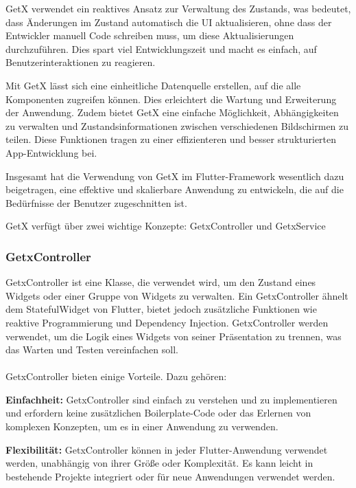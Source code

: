 GetX verwendet ein reaktives Ansatz zur Verwaltung des Zustands, was bedeutet, dass Änderungen im Zustand automatisch die UI aktualisieren, ohne dass der Entwickler manuell Code schreiben muss, um diese Aktualisierungen durchzuführen. Dies spart viel Entwicklungszeit und macht es einfach, auf Benutzerinteraktionen zu reagieren.

Mit GetX lässt sich eine einheitliche Datenquelle erstellen, auf die alle Komponenten zugreifen können. Dies erleichtert die Wartung und Erweiterung der Anwendung. Zudem bietet GetX eine einfache Möglichkeit, Abhängigkeiten zu verwalten und Zustandsinformationen zwischen verschiedenen Bildschirmen zu teilen. Diese Funktionen tragen zu einer effizienteren und besser strukturierten App-Entwicklung bei.

Insgesamt hat die Verwendung von GetX im Flutter-Framework wesentlich dazu beigetragen, eine effektive und skalierbare Anwendung zu entwickeln, die auf die Bedürfnisse der Benutzer zugeschnitten ist.



GetX verfügt über zwei wichtige Konzepte: GetxController und GetxService

\subsubsection{GetxController}
GetxController ist eine Klasse, die verwendet wird, um den Zustand eines Widgets oder einer Gruppe von Widgets zu verwalten. Ein GetxController ähnelt dem StatefulWidget von Flutter, bietet jedoch zusätzliche Funktionen wie reaktive Programmierung und Dependency Injection. GetxController werden verwendet, um die Logik eines Widgets von seiner Präsentation zu trennen, was das Warten und Testen vereinfachen soll.
\\\\
GetxController bieten einige Vorteile. Dazu gehören:

\textbf{Einfachheit:}
GetxController sind einfach zu verstehen und zu implementieren und erfordern keine zusätzlichen Boilerplate-Code oder das Erlernen von komplexen Konzepten, um es in einer Anwendung zu verwenden.

\textbf{Flexibilität:}
GetxController können in jeder Flutter-Anwendung verwendet werden, unabhängig von ihrer Größe oder Komplexität. Es kann leicht in bestehende Projekte integriert oder für neue Anwendungen verwendet werden.

